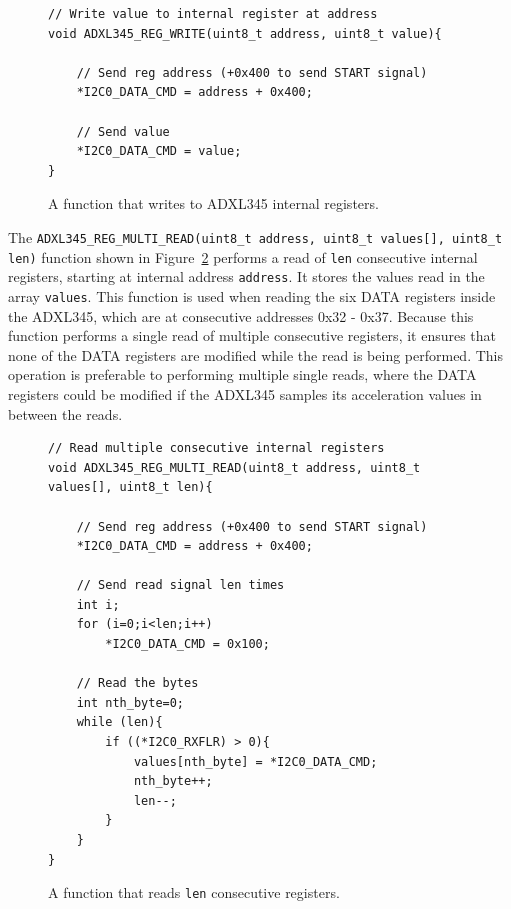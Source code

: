 \documentclass[11pt, twoside, pdftex]{article}
\begin{document}
\begin{figure}[H]
\begin{center}
\begin{minipage}[t]{16 cm}
\begin{lstlisting}
// Write value to internal register at address
void ADXL345_REG_WRITE(uint8_t address, uint8_t value){
    
    // Send reg address (+0x400 to send START signal)
    *I2C0_DATA_CMD = address + 0x400;
    
    // Send value
    *I2C0_DATA_CMD = value;
}
\end{lstlisting}
\end{minipage}
\end{center}
\vspace{-0.33in}\caption{A function that writes to ADXL345 internal registers.}
\label{fig:write_function}
\end{figure}

\pagebreak
The \texttt{ADXL345\_REG\_MULTI\_READ(uint8\_t address, uint8\_t values[], uint8\_t len)} function shown in Figure~\ref{fig:multi_read_function} performs a read of \texttt{len} consecutive internal registers, starting at internal address \texttt{address}. It stores the values read in the array \texttt{values}. This function is used when reading the six DATA registers inside the ADXL345, which are at consecutive addresses 0x32 - 0x37. Because this function performs a single read of multiple consecutive registers, it ensures that none of the DATA registers are modified while the read is being performed. This operation is preferable to performing multiple single reads, where the DATA registers could be modified if the ADXL345 samples its acceleration values in between the reads.

\begin{figure}[H]
\begin{center}
\begin{minipage}[t]{16 cm}
\begin{lstlisting}
// Read multiple consecutive internal registers
void ADXL345_REG_MULTI_READ(uint8_t address, uint8_t values[], uint8_t len){

    // Send reg address (+0x400 to send START signal)
    *I2C0_DATA_CMD = address + 0x400;
    
    // Send read signal len times
    int i;
    for (i=0;i<len;i++)
        *I2C0_DATA_CMD = 0x100;

    // Read the bytes
    int nth_byte=0;
    while (len){
        if ((*I2C0_RXFLR) > 0){
            values[nth_byte] = *I2C0_DATA_CMD;
            nth_byte++;
            len--;
        }
    }
}
\end{lstlisting}
\end{minipage}
\end{center}
\vspace{-0.33in}\caption{A function that reads \texttt{len} consecutive registers.}
\label{fig:multi_read_function}
\end{figure}
\end{document}
